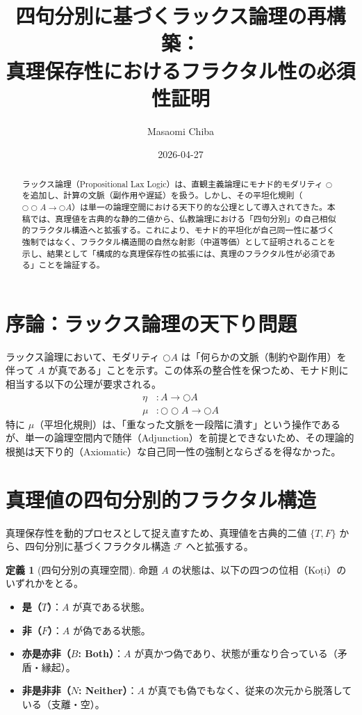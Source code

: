 \documentclass[11pt,a4paper]{article}
\theoremstyle{definition}
\newtheorem{definition}{定義}[section]
\newcommand{\Lax}{\bigcirc} %
\begin{document}
\title{四句分別に基づくラックス論理の再構築：\\真理保存性におけるフラクタル性の必須性証明}
\author{Masaomi Chiba}
\date{2026-04-27}
\maketitle

\begin{abstract}
ラックス論理（Propositional Lax Logic）は、直観主義論理にモナド的モダリティ $\Lax$ を追加し、計算の文脈（副作用や遅延）を扱う。しかし、その平坦化規則（$\Lax\Lax A \to \Lax A$）は単一の論理空間における天下り的な公理として導入されてきた。本稿では、真理値を古典的な静的二値から、仏教論理における「四句分別」の自己相似的フラクタル構造へと拡張する。これにより、モナド的平坦化が自己同一性に基づく強制ではなく、フラクタル構造間の自然な射影（中道等価）として証明されることを示し、結果として「構成的な真理保存性の拡張には、真理のフラクタル性が必須である」ことを論証する。
\end{abstract}

\section{序論：ラックス論理の天下り問題}

ラックス論理において、モダリティ $\Lax A$ は「何らかの文脈（制約や副作用）を伴って $A$ が真である」ことを示す。この体系の整合性を保つため、モナド則に相当する以下の公理が要求される。
\begin{align}
    \eta &: A \to \Lax A \\
    \mu &: \Lax\Lax A \to \Lax A
\end{align}
特に $\mu$（平坦化規則）は、「重なった文脈を一段階に潰す」という操作であるが、単一の論理空間内で随伴（Adjunction）を前提とできないため、その理論的根拠は天下り的（Axiomatic）な自己同一性の強制とならざるを得なかった。

\section{真理値の四句分別的フラクタル構造}

真理保存性を動的プロセスとして捉え直すため、真理値を古典的二値 $\{T, F\}$ から、四句分別に基づくフラクタル構造 $\mathcal{F}$ へと拡張する。

\begin{definition}[四句分別の真理空間]
命題 $A$ の状態は、以下の四つの位相（Ko\d{t}i）のいずれかをとる。
\begin{itemize}
    \item \textbf{是（$T$）}：$A$ が真である状態。
    \item \textbf{非（$F$）}：$A$ が偽である状態。
    \item \textbf{亦是亦非（$B$: Both）}：$A$ が真かつ偽であり、状態が重なり合っている（矛盾・縁起）。
    \item \textbf{非是非非（$N$: Neither）}：$A$ が真でも偽でもなく、従来の次元から脱落している（支離・空）。
\end{itemize}
\end{definition}
\end{document}
